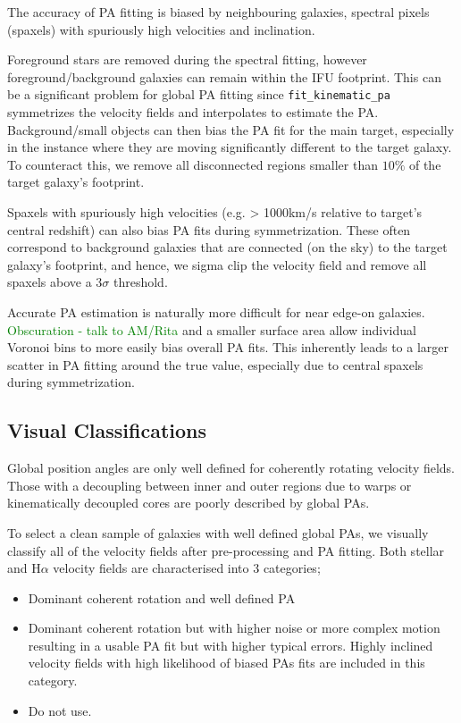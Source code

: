 \documentclass[fleqn,usenatbib]{mnras}
\newcommand{\green}[1]{{\textcolor{green}{#1}}}
\begin{document}
The accuracy of PA fitting is biased by neighbouring galaxies, spectral pixels (spaxels) with spuriously high velocities and inclination. 

Foreground stars are removed during the spectral fitting, however foreground/background galaxies can remain within the IFU footprint. This can be a significant problem for global PA fitting since \texttt{fit\_kinematic\_pa} symmetrizes the velocity fields and interpolates to estimate the PA. Background/small objects can then bias the PA fit for the main target, especially in the instance where they are moving significantly different to the target galaxy. To counteract this, we remove all disconnected regions smaller than $10\%$ of the target galaxy's footprint. 

Spaxels with spuriously high velocities (e.g. > 1000km/s relative to target's central redshift) can also bias PA fits during symmetrization. These often correspond to background galaxies that are connected (on the sky) to the target galaxy's footprint, and hence, we sigma clip the velocity field and remove all spaxels above a $3\sigma$ threshold.

Accurate PA estimation is naturally more difficult for near edge-on galaxies. \green{Obscuration - talk to AM/Rita} and a smaller surface area allow individual Voronoi bins to more easily bias overall PA fits. This inherently leads to a larger scatter in PA fitting around the true value, especially due to central spaxels during symmetrization.

\subsection{Visual Classifications}
Global position angles are only well defined for coherently rotating velocity fields. Those with a decoupling between inner and outer regions due to warps or kinematically decoupled cores are poorly described by global PAs. 

To select a clean sample of galaxies with well defined global PAs, we visually classify all of the velocity fields after pre-processing and PA fitting. Both stellar and H$\alpha$ velocity fields are characterised into 3 categories;
\begin{itemize}
    \item Dominant coherent rotation and well defined PA
    \item Dominant coherent rotation but with higher noise or more complex motion resulting in a usable PA fit but with higher typical errors. Highly inclined velocity fields with high likelihood of biased PAs fits are included in this category. 
    \item Do not use.
\end{itemize}
\end{document}
